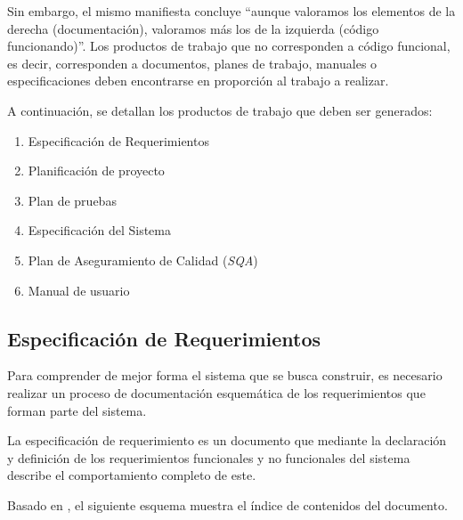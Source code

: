 Sin embargo, el mismo manifiesta concluye “aunque valoramos los elementos de la derecha (documentación), valoramos más los de la izquierda (código funcionando)”. Los productos de trabajo que no corresponden a código funcional, es decir, corresponden a documentos, planes de trabajo, manuales o especificaciones deben encontrarse en proporción al trabajo a realizar.

A continuación, se detallan los productos de trabajo que deben ser generados:

\begin{enumerate}
	\item Especificación de Requerimientos
	\item Planificación de proyecto
	\item Plan de pruebas
	\item Especificación del Sistema
	\item Plan de Aseguramiento de Calidad (\textit{SQA})
	\item Manual de usuario
\end{enumerate}

\subsection{Especificación de Requerimientos}

Para comprender de mejor forma el sistema que se busca construir, es necesario realizar un proceso de documentación esquemática de los requerimientos que forman parte del sistema.

La especificación de requerimiento es un documento que mediante la declaración y definición de los requerimientos funcionales y no funcionales del sistema describe el comportamiento completo de este.

Basado en \citet{mem00}, el siguiente esquema muestra el índice de contenidos del documento. 

